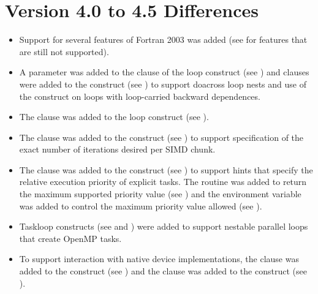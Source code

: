 \section{Version 4.0 to 4.5 Differences}
\label{sec:Version 4.0 to 4.5 Differences}
\begin{itemize}
\item Support for several features of Fortran 2003 was added (see
       for features that are still
      not supported).

\item A parameter was added to the  clause of the loop construct
      (see ) and clauses were added to the
       construct (see ) to
      support doacross loop nests and use of the  construct on
      loops with loop-carried backward dependences.

\item The  clause was added to the loop construct
      (see ).

\item The  clause was added to the  construct
      (see ) to support specification of
      the exact number of iterations desired per SIMD chunk.

\item The  clause was added to the  construct
      (see ) to support hints that specify
      the relative execution priority of explicit tasks. The
       routine was added to return
      the maximum supported priority value (see
      ) and the
       environment variable was added to
      control the maximum priority value allowed (see
      ).

\item Taskloop constructs (see  and
      ) were added to support
      nestable parallel loops that create OpenMP tasks.

\item To support interaction with native device implementations, the
       clause was added to the 
      construct (see ) and the
       clause was added to the  construct
      (see ).


\end{itemize}
